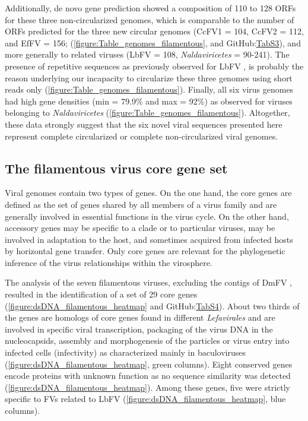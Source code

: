 Additionally, de novo gene prediction showed a composition of 110 to 128 ORFs for these three non-circularized genomes, which is comparable to the number of ORFs predicted for the three new circular genomes (CcFV1 = 104, CcFV2 = 112, and EfFV = 156; (\figurename{\ref{figure:Table_genomes_filamentous}}, and GitHub:\href{https://github.com/BenjaminGuinet/PhD_defense/blob/main/Supplementary_paper2/Table%20S3.xlsx}{TabS3}), and more generally to related viruses (LbFV = 108, \textit{Naldaviricetes} = 90-241). The presence of repetitive sequences as previously observed for LbFV \citep{lepetit_genome_2017}, is probably the reason underlying our incapacity to circularize these three genomes using short reads only (\figurename{\ref{figure:Table_genomes_filamentous}}). Finally, all six virus genomes had high gene densities (min = 79.9\% and max = 92\%) as observed for viruses belonging to \textit{Naldaviricetes} (\figurename{\ref{figure:Table_genomes_filamentous}}). Altogether, these data strongly suggest that the six novel viral sequences presented here represent complete circularized or complete non-circularized viral genomes.  

\subsection{The filamentous virus core gene set} 

Viral genomes contain two types of genes. On the one hand, the core genes are defined as the set of genes shared by all members of a virus family and are generally involved in essential functions in the virus cycle. On the other hand, accessory genes may be specific to a clade or to particular viruses, may be involved in adaptation to the host, and sometimes acquired from infected hosts by horizontal gene transfer. Only core genes are relevant for the phylogenetic inference of the virus relationships within the virosphere. 

The analysis of the seven filamentous viruses, excluding the contigs of DmFV \citep{wallace_discovery_2021}, resulted in the identification of a set of 29 core genes (\figurename{\ref{figure:dsDNA_filamentous_heatmap}} and GitHub:\href{https://github.com/BenjaminGuinet/PhD_defense/blob/main/Supplementary_paper2/Table%20S4.xlsx}{TabS4}). About two thirds of the genes are homologs of core genes found in different \textit{Lefavirales} and are involved in specific viral transcription, packaging of the virus DNA in the nucleocapsids, assembly and morphogenesis of the particles or virus entry into infected cells (infectivity) as characterized mainly in baculoviruses (\figurename{\ref{figure:dsDNA_filamentous_heatmap}}, green columns). Eight conserved genes encode proteins with unknown function as no sequence similarity was detected (\figurename{\ref{figure:dsDNA_filamentous_heatmap}}). Among these genes, five were strictly specific to FVs related to LbFV (\figurename{\ref{figure:dsDNA_filamentous_heatmap}}, blue columns). 


